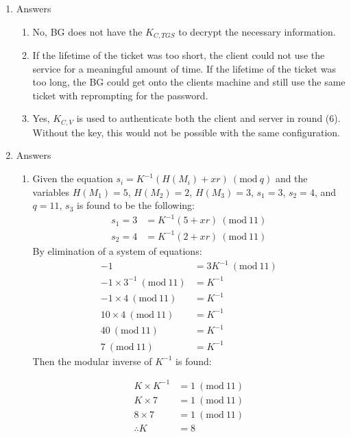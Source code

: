 \documentclass{article}
\newcommand{\Mod}[1]{\ (\mathrm{mod}\ #1)}
\begin{document}
\begin{enumerate}
    \item Answers
    \begin{enumerate}
        \item No, BG does not have the $K_{C, TGS}$ to decrypt the necessary information.
        
        \item If the lifetime of the ticket was too short, the client could not use the service for a meaningful amount of time. If the lifetime of the ticket was too long, the BG could get onto the clients machine and still use the same ticket with reprompting for the password.

        \item Yes, $K_{C, V}$ is used to authenticate both the client and server in round (6). Without the key, this would not be possible with the same configuration.
    \end{enumerate}

    \item Answers
    \begin{enumerate}
        \item Given the equation $s_i = K^{-1}(H(M_i) + xr) \Mod{q}$ and the variables $H(M_1) = 5$, $H(M_2) = 2$, $H(M_3) = 3$, $s_1 = 3$, $s_2 = 4$, and $q = 11$, $s_3$ is found to be the following:
        \begin{align*}
           s_1 = 3 &= K^{-1}(5 + xr) \Mod{11}\\
           s_2 = 4 &= K^{-1}(2 + xr) \Mod{11}
        \end{align*}
            By elimination of a system of equations:
        \begin{align*}
            -1 &= 3K^{-1} \Mod{11}\\
            -1 \times 3^{-1} \Mod{11} &= K^{-1}\\
            -1 \times 4 \Mod{11} &= K^{-1}\\
            10 \times 4 \Mod{11} &= K^{-1}\\
            40 \Mod{11} &= K^{-1}\\
            7 \Mod{11} &= K^{-1}
        \end{align*}
        Then the modular inverse of $K^{-1}$ is found:
        
        \begin{align*}
        K \times K^{-1} &= 1 \Mod{11}\\
        K \times 7 &= 1 \Mod{11}\\
        8 \times 7 &= 1 \Mod{11}\\
        \therefore K &= 8
        \end{align*}


\end{enumerate}
\end{enumerate}
\end{document}
